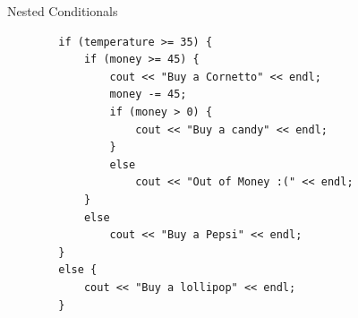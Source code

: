 \begin{frame}[fragile]{Nested Conditionals}{}
    \begin{verbatim}
        if (temperature >= 35) {
            if (money >= 45) {
                cout << "Buy a Cornetto" << endl;
                money -= 45;
                if (money > 0) {
                    cout << "Buy a candy" << endl;
                }
                else
                    cout << "Out of Money :(" << endl;
            }
            else
                cout << "Buy a Pepsi" << endl;
        }
        else {
            cout << "Buy a lollipop" << endl;
        }
    \end{verbatim}
\end{frame}
